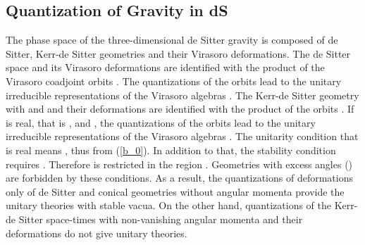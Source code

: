 \documentclass[a4paper,11pt]{article}
\begin{document}
\subsection{Quantization of Gravity in dS\coordHE{}}
The phase space of the three-dimensional de Sitter gravity is composed 
of de Sitter, Kerr-de Sitter geometries and their Virasoro 
deformations.
The de Sitter space and its Virasoro deformations are identified with 
the product of the Virasoro coadjoint orbits 
\coordHE{}. 
The quantizations of the orbits lead to the unitary irreducible
representations of the Virasoro algebras 
\coordHE{}.
The Kerr-de Sitter geometry with \coordHE{} and
\coordHE{} and their deformations 
\coordHE{}  are identified with the product of the orbits 
\coordHE{}.
If \coordHE{} is real, that is \coordHE{}, and \coordHE{}, 
the quantizations of the orbits lead to the unitary irreducible
representations of the Virasoro algebras 
\coordHE{}.
The unitarity condition that \coordHE{} is real means \coordHE{}, 
thus \coordHE{} from (\ref{b_0}).
In addition to that, the stability condition requires \coordHE{}. 
Therefore \myHighlight{$\mu$}\coordHE{} is restricted in the region \coordHE{}.
Geometries with excess angles (\coordHE{}) are forbidden 
by these conditions.
As a result, the quantizations of deformations only of de Sitter
and conical geometries without angular momenta provide the unitary theories
with stable vacua. 
On the other hand, quantizations of the Kerr-de Sitter space-times 
with non-vanishing angular momenta and their deformations 
do not give unitary theories.
\end{document}
